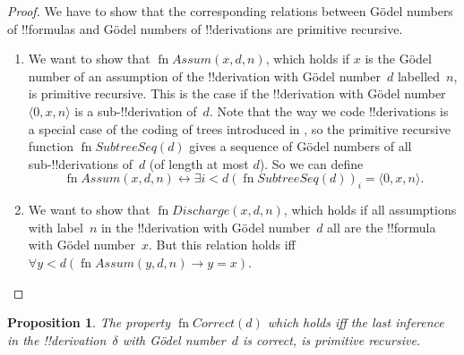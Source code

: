 \documentclass[10pt,a4paper]{article}
\makeatletter
\theoremstyle{plain}
\newtheorem{prop}[thm]{Proposition}
\theoremstyle{definition}
\theoremstyle{remark}
\newcommand*{\ollabel}[1]{\label{#1}}
\newcommand{\olref}{\@ifnextchar[{\olref@i}{\olref@final}}
\def\olref@i[#1]{\@ifnextchar[{\olref@ii}{\olref@final}}
\def\olref@ii[#1]{\@ifnextchar[{\olref@iii}{\olref@final}}
\def\olref@iii[#1]{\olref@final}
\def\olref@final#1{\ref{#1}}
\providecommand{\lif}{\mathbin{\rightarrow}}
\providecommand{\tuple}[1]{\langle #1 \rangle}
\providecommand{\bforall}{\forall}
\providecommand{\bexists}{\exists}
\providecommand{\defiff}{\mathrel{\leftrightarrow}}
\providecommand{\fn}{\operatorname{fn}}
\providecommand{\defiff}{\mathrel{\leftrightarrow}}
\providecommand{\fn}{\operatorname{fn}}
\makeatother
\begin{document}
\begin{proof}
  We have to show that the corresponding relations between G\"odel
  numbers of !!{formula}s and G\"odel numbers of !!{derivation}s are
  primitive recursive.
  \begin{enumerate}
  \item We want to show that $\fn{Assum}(x, d, n)$, which holds if $x$
    is the G\"odel number of an assumption of the !!{derivation} with
    G\"odel number~$d$ labelled~$n$, is primitive recursive.  This is
    the case if the !!{derivation} with G\"odel number~$\tuple{0, x,
      n}$ is a sub-!!{derivation} of~$d$. Note that the way we code
    !!{derivation}s is a special case of the coding of trees introduced in
    \olref[cmp][rec][tre]{sec}, so the primitive recursive function
    $\fn{SubtreeSeq}(d)$ gives a sequence of G\"odel numbers of all
    sub-!!{derivation}s of~$d$ (of length at most $d$). So we can
    define
    \[
    \fn{Assum}(x, d, n) \defiff \bexists{i<d}{(\fn{SubtreeSeq}(d))_i =
      \tuple{0, x, n}}.
    \]
  \item We want to show that $\fn{Discharge}(x, d, n)$, which holds if
    all assumptions with label~$n$ in the !!{derivation} with G\"odel
    number~$d$ all are the !!{formula} with G\"odel number~$x$.  But
    this relation holds iff $\bforall{y<d}{(\fn{Assum}(y, d, n) \lif y
      = x)}$.
  \end{enumerate}
\end{proof}

\begin{prop}
  \ollabel{prop:followsby}
  The property $\fn{Correct}(d)$ which holds iff the last inference in
  the !!{derivation}~$\delta$ with G\"odel number~$d$ is correct, is
  primitive recursive.
\end{prop}
\end{document}
